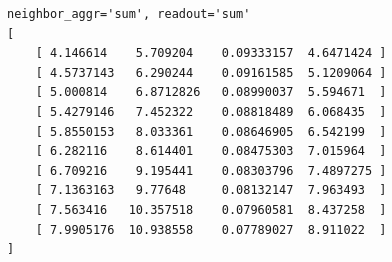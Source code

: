 \documentclass[a4paper]{article}
\begin{document}
\begin{verbatim}
neighbor_aggr='sum', readout='sum'
[
    [ 4.146614    5.709204    0.09333157  4.6471424 ]
    [ 4.5737143   6.290244    0.09161585  5.1209064 ]
    [ 5.000814    6.8712826   0.08990037  5.594671  ]
    [ 5.4279146   7.452322    0.08818489  6.068435  ]
    [ 5.8550153   8.033361    0.08646905  6.542199  ]
    [ 6.282116    8.614401    0.08475303  7.015964  ]
    [ 6.709216    9.195441    0.08303796  7.4897275 ]
    [ 7.1363163   9.77648     0.08132147  7.963493  ]
    [ 7.563416   10.357518    0.07960581  8.437258  ]
    [ 7.9905176  10.938558    0.07789027  8.911022  ]
]      
\end{verbatim}

% 
% 
\end{document}
